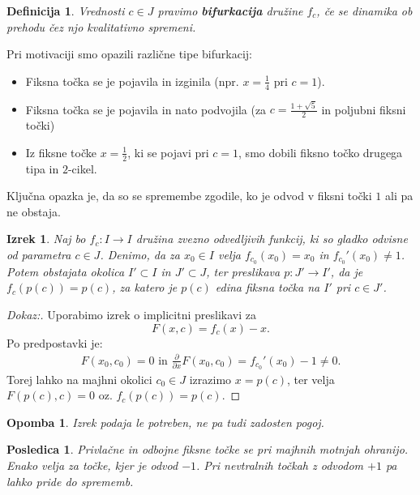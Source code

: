 \documentclass{article}
\newtheorem{definicija}{Definicija}
\newtheorem{posledica}{Posledica}
\newtheorem{opomba}{Opomba}
\newtheorem{izrek}{Izrek}
\begin{document}
\begin{definicija}
Vrednosti $c\in J$ pravimo \textbf{bifurkacija} družine $f_c$, če se dinamika 
ob prehodu čez njo kvalitativno spremeni.
\end{definicija}

Pri motivaciji smo opazili različne tipe bifurkacij:
\begin{itemize}
\item Fiksna točka se je pojavila in izginila (npr. $x = \frac{1}{4}$ pri $c=1$).
\item Fiksna točka se je pojavila in nato podvojila (za $c = \frac{1 + \sqrt{5}}{2}$ in poljubni fiksni točki)
\item Iz fiksne točke $x = \frac{1}{2}$, ki se pojavi pri $c = 1$, smo dobili fiksno točko drugega tipa in $2$-cikel.
\end{itemize}
Ključna opazka je, da so se spremembe zgodile, ko je odvod v fiksni točki $1$ ali pa ne obstaja.

\begin{izrek}
    \label{izrek:implicitna_preslikava}
Naj bo $f_c: I \rightarrow I$ družina zvezno odvedljivih funkcij, ki 
so gladko odvisne od parametra $c\in J$. Denimo, da za $x_0 \in I$ 
velja $f_{c_0}(x_0) = x_0$ in $f_{c_0}'(x_0) \neq 1$. Potem obstajata 
okolica $I' \subset I$ in $J' \subset J$, ter preslikava 
$p: J' \rightarrow I'$, da je $f_c(p(c)) = p(c)$, za katero je $p(c)$
 edina fiksna točka na $I'$ pri $c\in J'$. 
\end{izrek}

\begin{proof}[Dokaz:]
Uporabimo izrek o implicitni preslikavi za 
$$
F(x, c) = f_c(x) - x.
$$
Po predpostavki je:
\begin{align*}
F(x_0, c_0) = 0 \text{ in } \frac{\partial}{\partial x} F(x_0, c_0) = f_{c_0}'(x_0) - 1 \neq 0. 
\end{align*}
Torej lahko na majhni okolici $c_0 \in J$ izrazimo $x = p(c)$, ter velja $F(p(c), c) = 0$ oz. $f_c(p(c)) = p(c)$.
\end{proof}

\begin{opomba}
Izrek podaja le potreben, ne pa tudi zadosten pogoj.
\end{opomba}

\begin{posledica}
Privlačne in odbojne fiksne točke se pri majhnih motnjah ohranijo. Enako velja 
za točke, kjer je odvod $-1$. Pri nevtralnih točkah z odvodom $+1$ pa lahko pride 
do sprememb.
\end{posledica}
\end{document}

